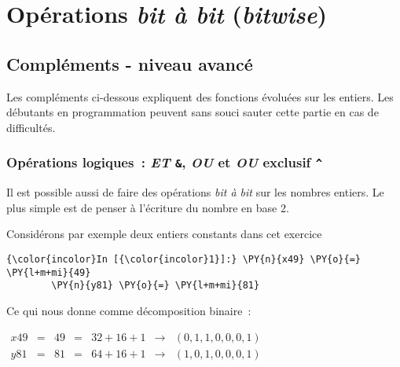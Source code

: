     
    
    
    

    

    \hypertarget{opuxe9rations-bit-uxe0-bit-bitwise}{%
\section{\texorpdfstring{Opérations \emph{bit à bit}
(\emph{bitwise})}{Opérations bit à bit (bitwise)}}\label{opuxe9rations-bit-uxe0-bit-bitwise}}

    \hypertarget{compluxe9ments---niveau-avancuxe9}{%
\subsection{Compléments - niveau
avancé}\label{compluxe9ments---niveau-avancuxe9}}

    Les compléments ci-dessous expliquent des fonctions évoluées sur les
entiers. Les débutants en programmation peuvent sans souci sauter cette
partie en cas de difficultés.

    \hypertarget{opuxe9rations-logiques-et-ou-et-ou-exclusif}{%
\subsubsection{\texorpdfstring{Opérations logiques~: \emph{ET}
\texttt{\&}, \emph{OU} \texttt{\textbar{}} et \emph{OU} exclusif
\texttt{\^{}}}{Opérations logiques~: ET \&, OU \textbar{} et OU exclusif \^{}}}\label{opuxe9rations-logiques-et-ou-et-ou-exclusif}}

    Il est possible aussi de faire des opérations \emph{bit à bit} sur les
nombres entiers. Le plus simple est de penser à l'écriture du nombre en
base 2.

Considérons par exemple deux entiers constants dans cet exercice

    \begin{Verbatim}[commandchars=\\\{\}]
{\color{incolor}In [{\color{incolor}1}]:} \PY{n}{x49} \PY{o}{=} \PY{l+m+mi}{49}
        \PY{n}{y81} \PY{o}{=} \PY{l+m+mi}{81}
\end{Verbatim}


    Ce qui nous donne comme décomposition binaire~:

\(\begin{array}{rcccccc} x49 & = & 49 & = & 32 + 16 + 1 & \rightarrow &(0,1,1,0,0,0,1) \\ y81 & = & 81 & = & 64 + 16 + 1 & \rightarrow &(1,0,1,0,0,0,1) \end{array}\)

